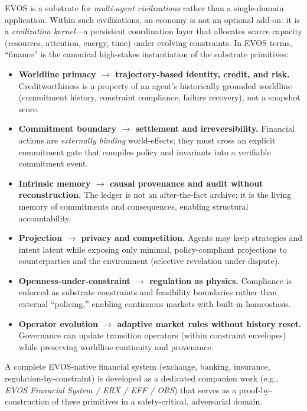 \documentclass[11pt]{article}
\begin{document}
EVOS is a substrate for \emph{multi-agent civilizations} rather than a single-domain application. Within such civilizations, an economy is not an optional add-on: it is a \emph{civilization kernel}---a persistent coordination layer that allocates scarce capacity (resources, attention, energy, time) under evolving constraints. In EVOS terms, ``finance'' is the canonical high-stakes instantiation of the substrate primitives:
\begin{itemize}
    \item \textbf{Worldline primacy $\rightarrow$ trajectory-based identity, credit, and risk.} Creditworthiness is a property of an agent's historically grounded worldline (commitment history, constraint compliance, failure recovery), not a snapshot score.
    \item \textbf{Commitment boundary $\rightarrow$ settlement and irreversibility.} Financial actions are \emph{externally binding} world-effects; they must cross an explicit commitment gate that compiles policy and invariants into a verifiable commitment event.
    \item \textbf{Intrinsic memory $\rightarrow$ causal provenance and audit without reconstruction.} The ledger is not an after-the-fact archive; it is the living memory of commitments and consequences, enabling structural accountability.
    \item \textbf{Projection $\rightarrow$ privacy and competition.} Agents may keep strategies and intent latent while exposing only minimal, policy-compliant projections to counterparties and the environment (selective revelation under dispute).
    \item \textbf{Openness-under-constraint $\rightarrow$ regulation as physics.} Compliance is enforced as substrate constraints and feasibility boundaries rather than external ``policing,'' enabling continuous markets with built-in homeostasis.
    \item \textbf{Operator evolution $\rightarrow$ adaptive market rules without history reset.} Governance can update transition operators (within constraint envelopes) while preserving worldline continuity and provenance.
\end{itemize}
A complete EVOS-native financial system (exchange, banking, insurance, regulation-by-constraint) is developed as a dedicated companion work (e.g., \emph{EVOS Financial System / ERX / EFF / ORS}) that serves as a proof-by-construction of these primitives in a safety-critical, adversarial domain.


\label{sec:app-civilizations}
\end{document}
